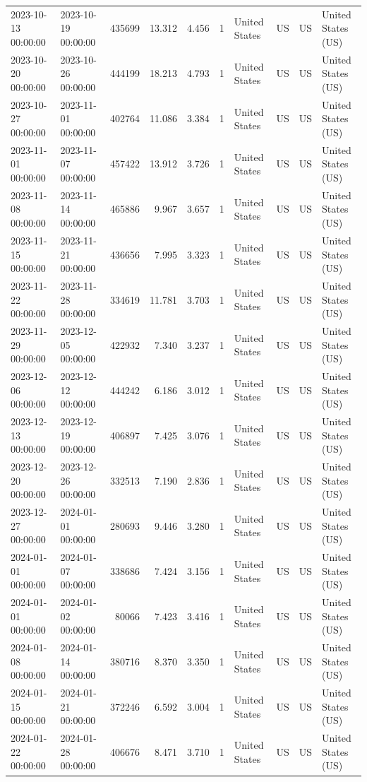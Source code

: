 \begin{tabular}{llrrrlllll}
2023-10-13 00:00:00 & 2023-10-19 00:00:00 & 435699 & 13.312 & 4.456 & 1 & United States & US & US & United States (US) \\
2023-10-20 00:00:00 & 2023-10-26 00:00:00 & 444199 & 18.213 & 4.793 & 1 & United States & US & US & United States (US) \\
2023-10-27 00:00:00 & 2023-11-01 00:00:00 & 402764 & 11.086 & 3.384 & 1 & United States & US & US & United States (US) \\
2023-11-01 00:00:00 & 2023-11-07 00:00:00 & 457422 & 13.912 & 3.726 & 1 & United States & US & US & United States (US) \\
2023-11-08 00:00:00 & 2023-11-14 00:00:00 & 465886 & 9.967 & 3.657 & 1 & United States & US & US & United States (US) \\
2023-11-15 00:00:00 & 2023-11-21 00:00:00 & 436656 & 7.995 & 3.323 & 1 & United States & US & US & United States (US) \\
2023-11-22 00:00:00 & 2023-11-28 00:00:00 & 334619 & 11.781 & 3.703 & 1 & United States & US & US & United States (US) \\
2023-11-29 00:00:00 & 2023-12-05 00:00:00 & 422932 & 7.340 & 3.237 & 1 & United States & US & US & United States (US) \\
2023-12-06 00:00:00 & 2023-12-12 00:00:00 & 444242 & 6.186 & 3.012 & 1 & United States & US & US & United States (US) \\
2023-12-13 00:00:00 & 2023-12-19 00:00:00 & 406897 & 7.425 & 3.076 & 1 & United States & US & US & United States (US) \\
2023-12-20 00:00:00 & 2023-12-26 00:00:00 & 332513 & 7.190 & 2.836 & 1 & United States & US & US & United States (US) \\
2023-12-27 00:00:00 & 2024-01-01 00:00:00 & 280693 & 9.446 & 3.280 & 1 & United States & US & US & United States (US) \\
2024-01-01 00:00:00 & 2024-01-07 00:00:00 & 338686 & 7.424 & 3.156 & 1 & United States & US & US & United States (US) \\
2024-01-01 00:00:00 & 2024-01-02 00:00:00 & 80066 & 7.423 & 3.416 & 1 & United States & US & US & United States (US) \\
2024-01-08 00:00:00 & 2024-01-14 00:00:00 & 380716 & 8.370 & 3.350 & 1 & United States & US & US & United States (US) \\
2024-01-15 00:00:00 & 2024-01-21 00:00:00 & 372246 & 6.592 & 3.004 & 1 & United States & US & US & United States (US) \\
2024-01-22 00:00:00 & 2024-01-28 00:00:00 & 406676 & 8.471 & 3.710 & 1 & United States & US & US & United States (US) \\

\end{tabular}
